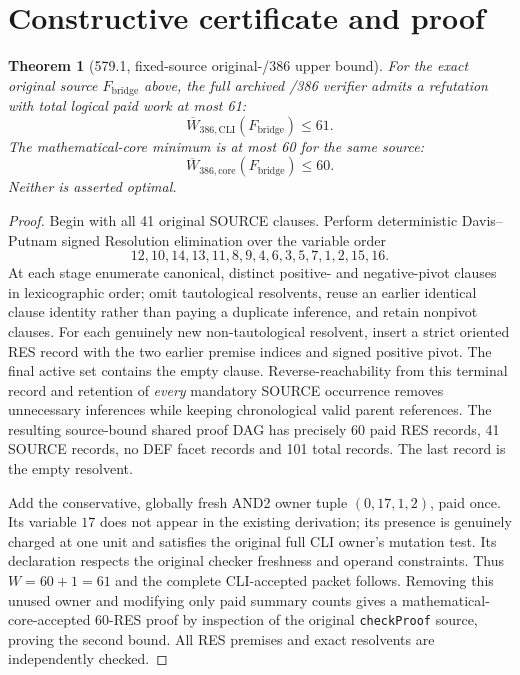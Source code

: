\documentclass[11pt]{article}
\newtheorem{theorem}{Theorem}
\begin{document}
\section*{Constructive certificate and proof}
\begin{theorem}[579.1, fixed-source original-/386 upper bound]
For the exact original source $F_{\mathrm{bridge}}$ above, the full archived /386 verifier admits a refutation with total logical paid work at most 61:
\[
\boxed{\overline W_{386,\mathrm{CLI}}(F_{\mathrm{bridge}})\leq 61.}
\]
The mathematical-core minimum is at most 60 for the same source:
\[
\boxed{\overline W_{386,\mathrm{core}}(F_{\mathrm{bridge}})\leq 60.}
\]
Neither is asserted optimal.
\end{theorem}
\begin{proof}
Begin with all 41 original SOURCE clauses. Perform deterministic Davis--Putnam signed Resolution elimination over the variable order
\[
12,10,14,13,11,8,9,4,6,3,5,7,1,2,15,16.
\]
At each stage enumerate canonical, distinct positive- and negative-pivot clauses in lexicographic order; omit tautological resolvents, reuse an earlier identical clause identity rather than paying a duplicate inference, and retain nonpivot clauses. For each genuinely new non-tautological resolvent, insert a strict oriented RES record with the two earlier premise indices and signed positive pivot. The final active set contains the empty clause. Reverse-reachability from this terminal record and retention of \emph{every} mandatory SOURCE occurrence removes unnecessary inferences while keeping chronological valid parent references. The resulting source-bound shared proof DAG has precisely 60 paid RES records, 41 SOURCE records, no DEF facet records and 101 total records. The last record is the empty resolvent.

Add the conservative, globally fresh AND2 owner tuple $(0,17,1,2)$, paid once. Its variable $17$ does not appear in the existing derivation; its presence is genuinely charged at one unit and satisfies the original full CLI owner's mutation test. Its declaration respects the original checker freshness and operand constraints. Thus $W=60+1=61$ and the complete CLI-accepted packet follows. Removing this unused owner and modifying only paid summary counts gives a mathematical-core-accepted 60-RES proof by inspection of the original \texttt{checkProof} source, proving the second bound. All RES premises and exact resolvents are independently checked. \qedhere
\end{proof}
\end{document}
